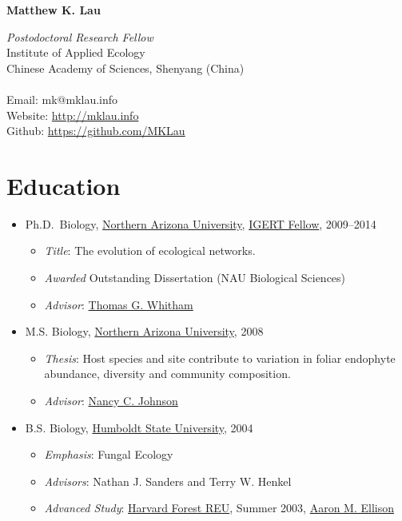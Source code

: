 \documentclass[a4paper]{article}
\author{}
\date{}
\begin{document}
\textbf{\Large Matthew K. Lau} \\

\hline

\begin{multicols}{2}
\textit{Postodoctoral Research Fellow} \\
Institute of Applied Ecology \\
Chinese Academy of Sciences, Shenyang (China) \\
\\
Email: mk@mklau.info \\
Website: \url{http://mklau.info} \\
Github: \url{https://github.com/MKLau} \\
\end{multicols}

\section{Education}\label{education}

\begin{itemize}
\item
  Ph.D.~Biology, \href{http://www.nau.edu}{Northern Arizona University},
  \href{http://www.mpcer.nau.edu/igert/}{IGERT Fellow}, 2009--2014

  \begin{itemize}
  \item
    \emph{Title}: The evolution of ecological networks.
  \item
    \emph{Awarded} Outstanding Dissertation (NAU Biological Sciences)
  \item
    \emph{Advisor}:
    \href{http://www6.nau.edu/biology/People/Faculty/Whitham/Whitham.htm}{Thomas
    G. Whitham}
  \end{itemize}
\item
  M.S. Biology, \href{http://www.nau.edu}{Northern Arizona University},
  2008
  \begin{itemize}
  \item
    \emph{Thesis}: Host species and site contribute to variation in
    foliar endophyte abundance, diversity and community composition.
  \item
    \emph{Advisor}:
    \href{http://www.nau.edu/~envsci/johnsonlab/index.htm}{Nancy C.
    Johnson}
  \end{itemize}
\item
  B.S. Biology, \href{http://www.humboldt.edu/~biosci/}{Humboldt State
  University}, 2004

  \begin{itemize}
  \item
    \emph{Emphasis}: Fungal Ecology
  \item
    \emph{Advisors}: Nathan J. Sanders and Terry W. Henkel
  \item
    \emph{Advanced Study}:
    \href{http://harvardforest.fas.harvard.edu/education/reu/reu.html}{Harvard
      Forest REU}, Summer 2003,
    \href{http://harvardforest.fas.harvard.edu/profiles/ellison.html}{Aaron
      M. Ellison}
  \end{itemize}
\end{itemize}
\end{document}
